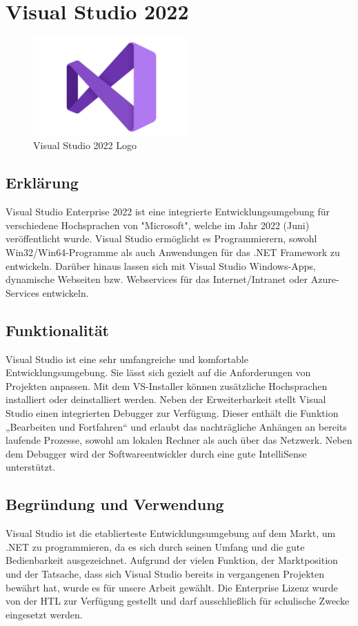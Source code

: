 \section{Visual Studio 2022}
\cite{VS2022}
\begin{figure}[h]
    \begin{center}
        \includegraphics*[width=6cm]{pics/Visual-Studio-Logo.png}
        \caption[VS 2022 Logo]{Visual Studio 2022 Logo \cite{VS2022logo}}
    \end{center}
\end{figure}
\subsection*{Erklärung}
Visual Studio Enterprise 2022 ist eine integrierte Entwicklungsumgebung für verschiedene 
Hochsprachen von "Microsoft", welche im Jahr 2022 (Juni) veröffentlicht wurde.
Visual Studio ermöglicht es Programmierern, sowohl Win32/Win64-Programme als
auch Anwendungen für das .NET Framework zu entwickeln. Darüber hinaus lassen sich
mit Visual Studio Windows-Apps, dynamische Webseiten bzw. Webservices für das
Internet/Intranet oder Azure-Services entwickeln.
\subsection*{Funktionalität}
Visual Studio ist eine sehr umfangreiche und komfortable Entwicklungsumgebung. Sie
lässt sich gezielt auf die Anforderungen von Projekten anpassen. Mit dem VS-Installer
können zusätzliche Hochsprachen installiert oder deinstalliert werden.
Neben der Erweiterbarkeit stellt Visual Studio einen integrierten Debugger zur Verfügung. Dieser enthält die Funktion „Bearbeiten und Fortfahren“ und erlaubt das
nachträgliche Anhängen an bereits laufende Prozesse, sowohl am lokalen Rechner als
auch über das Netzwerk. Neben dem Debugger wird der Softwareentwickler durch eine
gute IntelliSense unterstützt.
\subsection*{Begründung und Verwendung}
Visual Studio ist die etablierteste Entwicklungsumgebung auf dem Markt, um .NET
zu programmieren, da es sich durch seinen Umfang und die gute Bedienbarkeit ausgezeichnet. Aufgrund der vielen Funktion, der Marktposition und der Tatsache, dass
sich Visual Studio bereits in vergangenen Projekten bewährt hat, wurde es für unsere
Arbeit gewählt. Die Enterprise Lizenz wurde von der HTL zur Verfügung gestellt und
darf ausschließlich für schulische Zwecke eingesetzt werden.
\newpage

